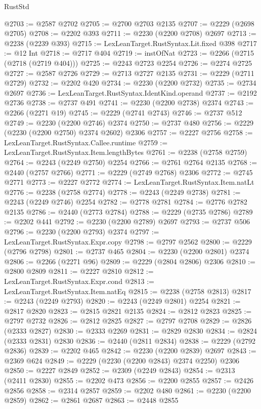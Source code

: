 \begin{lexlean}{RustStd}
\begin{coremodule}
@2703 := @2587 @2702
@2705 := @2700 @2703 @2135
@2707 := @2229 (@2698 @2705)
@2708 := @2202 @393
@2711 := @2230 (@2200 @2708) @2697
@2713 := @2238 (@2239 @393)
@2715 := LexLeanTarget.RustSyntax.Lit.fixed @398
@2717 := @12 Int
@2718 := @2717 @404
@2719 := instOfNat
@2723 := @2266 (@2715 (@2718 (@2719 @404)))
@2725 := @2243 @2723 @2254
@2726 := @2274 @2725
@2727 := @2587 @2726
@2729 := @2713 @2727 @2135
@2731 := @2229 (@2711 @2729)
@2732 := @2202 @420
@2734 := @2230 (@2200 @2732)
@2735 := @2734 @2697
@2736 := LexLeanTarget.RustSyntax.IdentKind.operand
@2737 := @2192 @2736
@2738 := @2737 @491
@2741 := @2230 (@2200 @2738) @2374
@2743 := @2266 (@2271 @19)
@2745 := @2229 (@2741 @2743)
@2746 := @2737 @512
@2749 := @2230 (@2200 @2746) @2374
@2750 := @2737 @480
@2756 := @2229 (@2230 (@2200 @2750) @2374 @2602) @2306
@2757 := @2227 @2756
@2758 := LexLeanTarget.RustSyntax.Callee.runtime
@2759 := LexLeanTarget.RustSyntax.Item.lengthBytes
@2761 := @2238 (@2758 @2759)
@2764 := @2243 (@2249 @2750) @2254
@2766 := @2761 @2764 @2135
@2768 := @2440 (@2757 @2766)
@2771 := @2229 (@2749 @2768) @2306
@2772 := @2745 @2771
@2773 := @2227 @2772
@2774 := LexLeanTarget.RustSyntax.Item.natLt
@2776 := @2238 (@2758 @2774)
@2778 := @2243 (@2249 @2738)
@2781 := @2243 (@2249 @2746) @2254
@2782 := @2778 @2781
@2784 := @2776 @2782 @2135
@2786 := @2440 (@2773 @2784)
@2788 := @2229 (@2735 @2786)
@2789 := @2202 @441
@2792 := @2230 (@2200 @2789) @2697
@2793 := @2737 @506
@2796 := @2230 (@2200 @2793) @2374
@2797 := LexLeanTarget.RustSyntax.Expr.copy
@2798 := @2797 @2562
@2800 := @2229 (@2796 @2798)
@2801 := @2737 @465
@2804 := @2230 (@2200 @2801) @2374
@2806 := @2266 (@2271 @96)
@2809 := @2229 (@2804 @2806) @2306
@2810 := @2800 @2809
@2811 := @2227 @2810
@2812 := LexLeanTarget.RustSyntax.Expr.cond
@2813 := LexLeanTarget.RustSyntax.Item.natEq
@2815 := @2238 (@2758 @2813)
@2817 := @2243 (@2249 @2793)
@2820 := @2243 (@2249 @2801) @2254
@2821 := @2817 @2820
@2823 := @2815 @2821 @2135
@2824 := @2812 @2823
@2825 := @2797 @2732
@2826 := @2812 @2825
@2827 := @2797 @2708
@2829 := @2826 (@2333 @2827)
@2830 := @2333 @2269
@2831 := @2829 @2830
@2834 := @2824 (@2333 @2831) @2830
@2836 := @2440 (@2811 @2834)
@2838 := @2229 (@2792 @2836)
@2839 := @2202 @465
@2842 := @2230 (@2200 @2839) @2697
@2843 := @2369 @624
@2849 := @2229 (@2230 (@2200 @2843) @2374 @2250) @2306
@2850 := @2227 @2849
@2852 := @2309 (@2249 @2843)
@2854 := @2313 (@2411 @2830)
@2855 := @2202 @473
@2856 := @2200 @2855
@2857 := @2426 @2856
@2858 := @2314 @2857
@2859 := @2202 @480
@2861 := @2230 (@2200 @2859)
@2862 := @2861 @2687
@2863 := @2448 @2855

\end{coremodule}
\end{lexlean}
